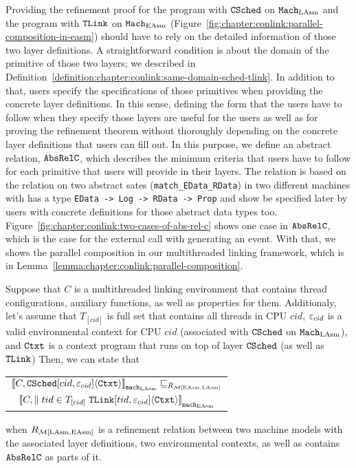 Providing the refinement proof for the program with ${{\mathrm{\texttt{CSched}}}}$ on ${\mathrm{\texttt{Mach}}}_{\mathrm{LAsm}}$ and the program with ${{\mathrm{\texttt{TLink}}}}$ on ${\mathrm{\texttt{Mach}}}_{\mathrm{EAsm}}$ (Figure~\ref{fig:chapter:conlink:parallel-composition-in-easm})
should have to rely on the detailed information of those two layer definitions.
A straightforward condition is about the domain of the primitive of those two layers; we described in Definition~\ref{definition:chapter:conlink:same-domain-sched-tlink}. 
In addition to that, 
users specify the specifications of those primitives when providing the concrete layer definitions. 
In this sense, defining the form that the users have to follow when they specify those layers
are useful for the users as well as for proving the refinement theorem without thoroughly depending on the concrete layer definitions that users can fill out.  
In this purpose, we define an abstract relation, ${\mathrm{\texttt{AbsRelC}}}$,
which describes the minimum criteria that users have to follow for each primitive that users will provide in their layers.
The relation is based on the relation on two abstract sates (\lstinline$match_EData_RData$) in two different machines with has a
type \lstinline$EData -> Log -> RData -> Prop$ and show be specified later by users with  concrete definitions for those abstract data types too. Figure~\ref{fig:chapter:conlink:two-cases-of-abs-rel-c} shows 
one case in  ${\mathrm{\texttt{AbsRelC}}}$, which is the case 
for the external call with generating an event. 
With that, we shows the parallel composition in our multithreaded linking framework, which is in Lemma~\ref{lemma:chapter:conlink:parallel-composition}. 

\begin{lemma}
\label{lemma:chapter:conlink:parallel-composition}
Suppose that $C$ is a multithreaded linking environment that contains thread configurations, auxiliary functions, as well as properties for them. 
Additionaly, let's assume that  $T_{[cid]}$ is full set that contains all threads in CPU $cid$, 
 ${\varepsilon}_{cid}$ is a valid
environmental context for CPU $cid$ (associated with ${{\mathrm{\texttt{CSched}}}}$ on ${\mathrm{\texttt{Mach}}}_{\mathrm{LAsm}}$),
and ${\mathrm{\texttt{Ctxt}}}$ is a
context program that runs on top of layer ${{\mathrm{\texttt{CSched}}}}$ (as well as ${{\mathrm{\texttt{TLink}}}}$)
 Then, we can state that
 \begin{center}
\begin{tabular}{c}
${[\![{C, {{\mathrm{\texttt{CSched}}}}[cid, {\varepsilon}_{cid}]} \langle {{\mathrm{\texttt{Ctxt}}}} \rangle]\!]}_{{\mathrm{\texttt{mach}}}_{\mathrm{LAsm}}} \sqsubseteq_{R_{\mathcal{M}{[\mathrm{EAsm}, \mathrm{LAsm}]}}}$\\ 
${[\![{C, \parallel tid \in T_{[cid]} \  {{\mathrm{\texttt{TLink}}}}[tid, {\varepsilon}_{cid}]} \langle {{\mathrm{\texttt{Ctxt}}}} \rangle]\!]}_{{{\mathrm{\texttt{mach}}}_{\mathrm{EAsm}}}}$\\
\end{tabular}
\end{center}
when $R_{\mathcal{M}{[\mathrm{LAsm}, \mathrm{EAsm}]}}$ is a refinement relation between two machine models with the associated layer definitions,
 two environmental contexts,
as well as contains ${\mathrm{\texttt{AbsRelC}}}$ as parts of it.
\end{lemma}


